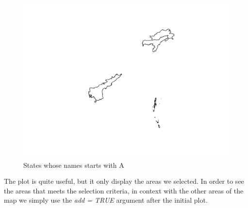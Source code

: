 \documentclass[]{article}
\newenvironment{Shaded}{}{}
\newcommand{\CommentTok}[1]{\textcolor[rgb]{0.38,0.63,0.69}{\textit{#1}}}
\newcommand{\DataTypeTok}[1]{\textcolor[rgb]{0.56,0.13,0.00}{#1}}
\newcommand{\KeywordTok}[1]{\textcolor[rgb]{0.00,0.44,0.13}{\textbf{#1}}}
\newcommand{\NormalTok}[1]{#1}
\newcommand{\OperatorTok}[1]{\textcolor[rgb]{0.40,0.40,0.40}{#1}}
\newcommand{\OtherTok}[1]{\textcolor[rgb]{0.00,0.44,0.13}{#1}}
\newcommand{\StringTok}[1]{\textcolor[rgb]{0.25,0.44,0.63}{#1}}
\begin{document}
\begin{figure}
\centering
\includegraphics{TutorialNotebook_files/figure-latex/unnamed-chunk-8-1.pdf}
\caption{States whose names starts with A}
\end{figure}

The plot is quite useful, but it only display the areas we selected. In
order to see the areas that meets the selection criteria, in context
with the other areas of the map we simply use the \emph{add = TRUE}
argument after the initial plot.

\begin{Shaded}
\end{Shaded}
\end{document}
